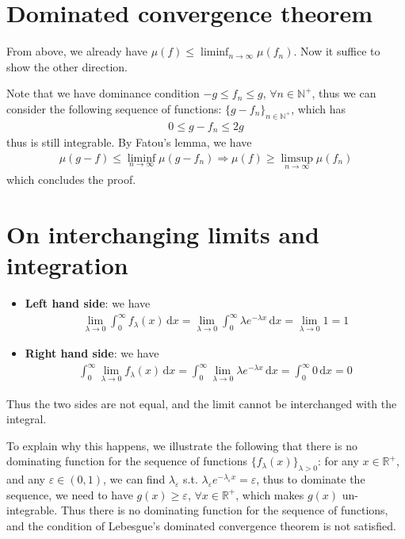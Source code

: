 \documentclass[11pt,a4paper]{article}
\numberwithin{equation}{section}%
\begin{document}
\section{Dominated convergence theorem}

From above, we already have $ \mu (f) \leq \liminf_{n\to\infty} \mu (f_n) $. Now it suffice to show the other direction.

Note that we have dominance condition $ -g \leq f_n \leq g $, $ \forall n\in \mathbb{N}^+ $, thus we can consider the following sequence of functions: $ \{ g-f_n \}_{n\in\mathbb{N}^+} $, which has
\begin{align*}
    0\leq g-f_n \leq 2g 
\end{align*}
thus is still integrable. By Fatou's lemma, we have
\begin{align*}
    \mu (g-f) \leq \liminf_{n\to\infty} \mu (g-f_n)  \Rightarrow \mu (f) \geq \limsup_{n\to\infty} \mu (f_n)
\end{align*}
which concludes the proof.

\section{On interchanging limits and integration}

\begin{itemize}[topsep=2pt,itemsep=0pt]
    \item \textbf{Left hand side}: we have
    \begin{align*}
        \lim_{\lambda \to 0 }\int_0^\infty f_\lambda (x)\,\mathrm{d}x = \lim_{\lambda \to 0 }\int_0^\infty \lambda e^{-\lambda x}\,\mathrm{d}x = \lim_{\lambda \to 0 }1 = 1 
    \end{align*}
    \item \textbf{Right hand side}: we have
    \begin{align*}
        \int_0^\infty \lim_{\lambda \to 0 }f_\lambda (x)\,\mathrm{d}x = \int_0^\infty \lim_{\lambda \to 0 }\lambda e^{-\lambda x}\,\mathrm{d}x = \int_0^\infty 0\,\mathrm{d}x = 0 
    \end{align*}
\end{itemize}

Thus the two sides are not equal, and the limit cannot be interchanged with the integral. 

To explain why this happens, we illustrate the following that there is no dominating function for the sequence of functions $ \{f_\lambda (x)\}_{\lambda>0} $: for any $ x\in\mathbb{R}^+ $, and any $ \varepsilon \in (0,1) $, we can find $ \lambda_\varepsilon  $ s.t. $ \lambda_\varepsilon  e^{-\lambda_\varepsilon  x} = \varepsilon $, thus to dominate the sequence, we need to have $ g(x) \geq \varepsilon $, $ \forall x\in\mathbb{R}^+ $, which makes $ g(x) $ un-integrable. Thus there is no dominating function for the sequence of functions, and the condition of Lebesgue's dominated convergence theorem is not satisfied.
\end{document}
